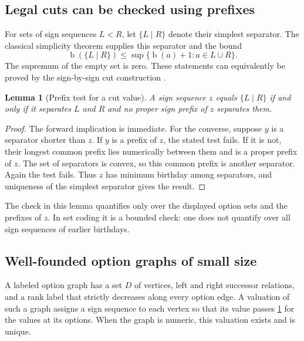 \documentclass[11pt,letterpaper]{article}
\newtheorem{lemma}[lemma]{Lemma}\aliascntresetthe{lemma}
\theoremstyle{definition}
\theoremstyle{remark}
\newcommand{\bd}{\operatorname{b}}
\begin{document}
\subsection{Legal cuts can be checked using prefixes}

For sets of sign sequences $L<R$, let $\{L\mid R\}$ denote their simplest
separator. The classical simplicity theorem supplies this separator and the
bound
\begin{equation}
 \bd(\{L\mid R\})\le
 \sup\{\bd(a)+1:a\in L\cup R\}.
 \label{hset:eq:cut-bound}
\end{equation}
The supremum of the empty set is zero. These statements can equivalently be
proved by the sign-by-sign cut construction \cite{Gonshor}.

\begin{lemma}[Prefix test for a cut value]
\label{hset:lem:cut-test}
A sign sequence $z$ equals $\{L\mid R\}$ if and only if it separates $L$ and
$R$ and no proper sign prefix of $z$ separates them.
\end{lemma}
\begin{proof}
The forward implication is immediate. For the converse, suppose $y$ is a
separator shorter than $z$. If $y$ is a prefix of $z$, the stated test fails.
If it is not, their longest common prefix lies numerically between them and
is a proper prefix of $z$. The set of separators is convex, so this common
prefix is another separator. Again the test fails. Thus $z$ has minimum
birthday among separators, and uniqueness of the simplest separator gives
the result.
\end{proof}

The check in this lemma quantifies only over the displayed option sets and
the prefixes of $z$. In set coding it is a bounded check: one does not
quantify over all sign sequences of earlier birthdays.

\subsection{Well-founded option graphs of small size}

A labeled option graph has a set $D$ of vertices, left and right successor
relations, and a rank label that strictly decreases along every option edge.
A valuation of such a graph assigns a sign sequence to each vertex so that
its value passes \cref{hset:lem:cut-test} for the values at its options. When
the graph is numeric, this valuation exists and is unique.
\end{document}
